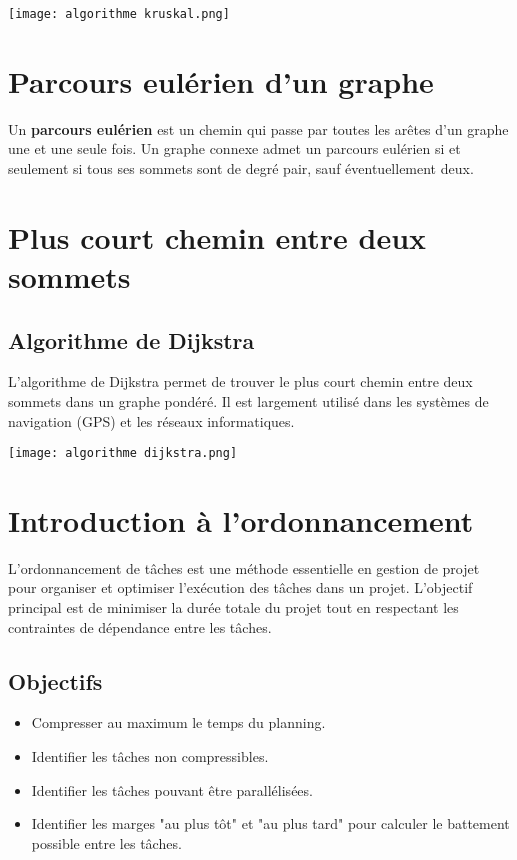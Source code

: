 \documentclass[10pt,a4paper]{article}
\begin{document}
\texttt{[image: algorithme kruskal.png]}

\section*{Parcours eulérien d'un graphe}

Un \textbf{parcours eulérien} est un chemin qui passe par toutes les arêtes d'un graphe une et une seule fois. Un graphe connexe admet un parcours eulérien si et seulement si tous ses sommets sont de degré pair, sauf éventuellement deux.

\section*{Plus court chemin entre deux sommets}

\subsection*{Algorithme de Dijkstra}

L'algorithme de Dijkstra permet de trouver le plus court chemin entre deux sommets dans un graphe pondéré. Il est largement utilisé dans les systèmes de navigation (GPS) et les réseaux informatiques.

\texttt{[image: algorithme dijkstra.png]}

\section*{Introduction à l'ordonnancement}
L'ordonnancement de tâches est une méthode essentielle en gestion de projet pour organiser et optimiser l'exécution des tâches dans un projet. L'objectif principal est de minimiser la durée totale du projet tout en respectant les contraintes de dépendance entre les tâches.

\subsection*{Objectifs}
\begin{itemize}
    \item Compresser au maximum le temps du planning.
    \item Identifier les tâches non compressibles.
    \item Identifier les tâches pouvant être parallélisées.
    \item Identifier les marges "au plus tôt" et "au plus tard" pour calculer le battement possible entre les tâches.
\end{itemize}
\end{document}
